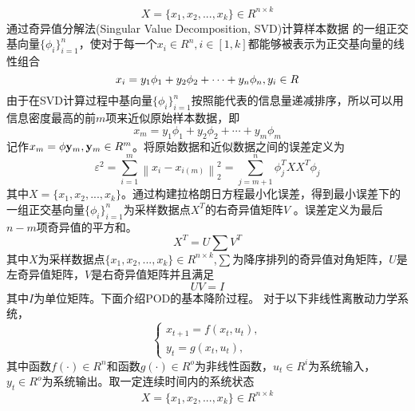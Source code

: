 \begin{equation}
  \label{eq:1}
X = \{ {x_1},{x_2},...,{x_k}\}  \in {R^{n \times k}}
\end{equation}
通过奇异值分解法(Singular Value Decomposition, SVD)计算样本数据 的一组正交基向量$\{ {\phi _i}\} _{i = 1}^n$，使对于每一个${x_i} \in {R^n},i \in [1,k]$都能够被表示为正交基向量的线性组合
\begin{equation}
  \label{eq:2}
{x_i} = {y_1}{\phi _1} + {y_2}{\phi _2} +  \cdots  + {y_n}{\phi _n},{\rm{ }}{y_i} \in R
\end{equation}
由于在SVD计算过程中基向量$\{ {\phi _i}\} _{i = 1}^n$按照能代表的信息量递减排序，所以可以用信息密度最高的前$m$项来近似原始样本数据，即
\begin{equation}
  \label{eq:3}
  {x_m} = {y_1}{\phi _1} + {y_2}{\phi _2} +  \cdots  + {y_m}{\phi _m}
\end{equation}
记作${x_m} = \phi {{\bf{y}}_m},{{\bf{y}}_m} \in {R^m}$。将原始数据和近似数据之间的误差定义为
\begin{equation}
  \label{eq:4}
{\varepsilon ^2} = \sum\limits_{i = 1}^m {\left\| {{x_i} - {x_{i(m)}}} \right\|_2^2}  = \sum\limits_{j = m + 1}^n {\phi _j^T} X{X^T}{\phi _j}
\end{equation}
其中$X = \{ {x_1},{x_2},...,{x_k}\} $。通过构建拉格朗日方程最小化误差，得到最小误差下的一组正交基向量$\{ {\phi _i}\} _{i = 1}^n$为采样数据点${X^T}$的右奇异值矩阵$V$ \cite{chatterjeeIntroductionProperOrthogonal2000}。误差定义为最后$n-m$项奇异值的平方和。
\begin{equation}
\label{eq:5}
  {X^T} = U\sum {V^T}
\end{equation}
其中$X$为采样数据点$\{ {x_1},{x_2},...,{x_k}\}  \in {R^{n \times k}}$,$\sum $为降序排列的奇异值对角矩阵，$U$是左奇异值矩阵，$V$是右奇异值矩阵并且满足
\begin{equation}
\label{eq:6}
UV = I
\end{equation}
其中$I$为单位矩阵。下面介绍POD的基本降阶过程。
对于以下非线性离散动力学系统，
\begin{equation}
\label{eq:7}
\left\{ \begin{array}{l}
  {x_{t + 1}} = f({x_t},{u_t}),\\
  {y_t} = g({x_t},{u_t}),
  \end{array} \right.
\end{equation}
其中函数$f( \cdot ) \in {R^n}$和函数$g( \cdot ) \in {R^o}$为非线性函数，${u_t} \in {R^i}$为系统输入，${y_t} \in {R^o}$为系统输出。取一定连续时间内的系统状态
\begin{equation}
\label{eq:8}
X = \{ {x_1},{x_2},...,{x_k}\}  \in {R^{n \times k}}
\end{equation}
